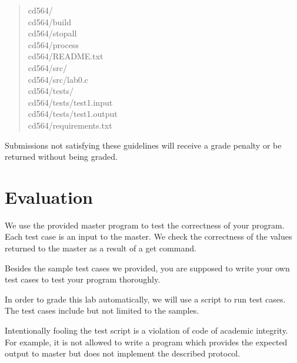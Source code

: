 \documentclass[11pt]{article}
\begin{document}
	\begin{quote}
		cd564/\\
		cd564/build\\
		cd564/stopall\\
		cd564/process\\
		cd564/README.txt\\
		cd564/src/\\
		cd564/src/lab0.c\\
		cd564/tests/\\
		cd564/tests/test1.input\\
		cd564/tests/test1.output\\
		cd564/requirements.txt\\
	\end{quote}
	
	
	Submissions not satisfying these guidelines will receive a grade penalty or be returned without being graded.
	
	\section{Evaluation}
	\begin{compactitem}
		\item We use the provided master program to test the correctness of	your program. Each test case is an input to the master.  We check the correctness of the values returned to the master as a result of a get command.
		\item Besides the sample test cases we provided, you are supposed to write your own test cases to test your program thoroughly.
		\item In order to grade this lab automatically, we will use a script to run test cases. The test cases include but not limited to the samples.
		\item Intentionally fooling the test script is a violation of code of academic integrity. For example, it is not allowed to write a program which provides the expected output to master but does not implement the described protocol.
	\end{compactitem}
	
\end{document}
